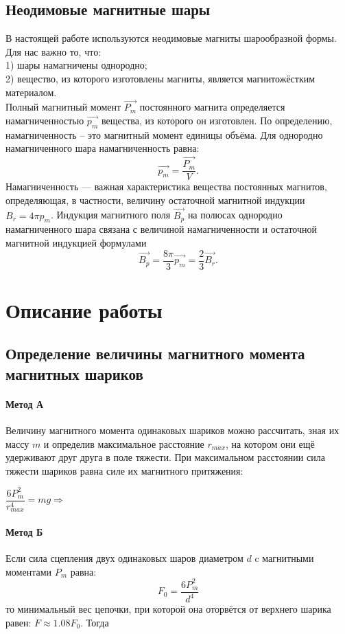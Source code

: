 \subsection*{Неодимовые магнитные шары}
В настоящей работе используются неодимовые магниты шарообразной формы.
Для нас важно то, что:\\
1) шары намагничены однородно;\\
2) вещество, из которого изготовлены магниты, является магнитожёстким материалом.\\
Полный магнитный момент $\overrightarrow{P_m}$
постоянного магнита определяется намагниченностью $\overrightarrow{p_m}$
вещества, из которого он изготовлен. По определению, намагниченность – это магнитный момент единицы объёма. Для однородно намагниченного шара намагниченность равна:
$$
\overrightarrow{p_m}=\dfrac{\overrightarrow{P_m}}{V}.
$$
Намагниченность — важная характеристика вещества постоянных магнитов, определяющая, в
частности, величину остаточной магнитной индукции $B_r = 4\pi p_m$. Индукция магнитного поля $\overrightarrow{B_p}$
на полюсах однородно намагниченного шара связана с величиной намагниченности и остаточной магнитной индукцией формулами
$$
\overrightarrow{B_p}=\dfrac{8\pi}{3}\overrightarrow{p_m}=\dfrac{2}{3}\overrightarrow{B_r}.
$$
\section*{Описание работы}
\subsection*{Определение величины магнитного момента магнитных шариков}
\paragraph*{Метод А}
Величину магнитного момента одинаковых шариков
можно рассчитать, зная их массу $m$ и определив максимальное расстояние $r_{max}$, на котором они ещё удерживают друг
друга в поле тяжести. При максимальном расстоянии сила тяжести шариков равна силе их магнитного притяжения:
\begin{center}
$\dfrac{6P_m^2}{r_{max}^4}=mg\Rightarrow$ 
\end{center}
\paragraph*{Метод Б}
Если сила сцепления двух одинаковых шаров диаметром $d$ c магнитными моментами $P_m$ равна:
$$
F_0 = \dfrac{6P_m^2}{d^4}
$$
то минимальный вес цепочки, при которой она оторвётся от верхнего шарика равен: $F \approx 1.08 F_0$. Тогда\\
\begin{center}
\end{center}
